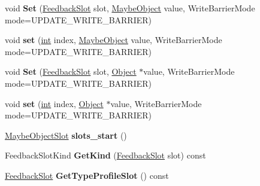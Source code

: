 \begin{DoxyCompactItemize}
void {\bfseries Set} (\mbox{\hyperlink{classv8_1_1internal_1_1FeedbackSlot}{Feedback\+Slot}} slot, \mbox{\hyperlink{classv8_1_1internal_1_1MaybeObject}{Maybe\+Object}} value, Write\+Barrier\+Mode mode=U\+P\+D\+A\+T\+E\+\_\+\+W\+R\+I\+T\+E\+\_\+\+B\+A\+R\+R\+I\+ER)
\item 
\mbox{\label{classv8_1_1internal_1_1FeedbackVector_a990a92b16bdd10fed3f2171a429e93ea}} 
void {\bfseries set} (\mbox{\hyperlink{classint}{int}} index, \mbox{\hyperlink{classv8_1_1internal_1_1MaybeObject}{Maybe\+Object}} value, Write\+Barrier\+Mode mode=U\+P\+D\+A\+T\+E\+\_\+\+W\+R\+I\+T\+E\+\_\+\+B\+A\+R\+R\+I\+ER)
\item 
\mbox{\label{classv8_1_1internal_1_1FeedbackVector_a4659ee16139f9aef68619f567f7bc4fc}} 
void {\bfseries Set} (\mbox{\hyperlink{classv8_1_1internal_1_1FeedbackSlot}{Feedback\+Slot}} slot, \mbox{\hyperlink{classv8_1_1internal_1_1Object}{Object}} $\ast$value, Write\+Barrier\+Mode mode=U\+P\+D\+A\+T\+E\+\_\+\+W\+R\+I\+T\+E\+\_\+\+B\+A\+R\+R\+I\+ER)
\item 
\mbox{\label{classv8_1_1internal_1_1FeedbackVector_a2d9eb85735692cc1f1488fc8409e2196}} 
void {\bfseries set} (\mbox{\hyperlink{classint}{int}} index, \mbox{\hyperlink{classv8_1_1internal_1_1Object}{Object}} $\ast$value, Write\+Barrier\+Mode mode=U\+P\+D\+A\+T\+E\+\_\+\+W\+R\+I\+T\+E\+\_\+\+B\+A\+R\+R\+I\+ER)
\item 
\mbox{\label{classv8_1_1internal_1_1FeedbackVector_a69e1e7d094cc71bc27ceac00d36624b4}} 
\mbox{\hyperlink{classv8_1_1internal_1_1MaybeObjectSlot}{Maybe\+Object\+Slot}} {\bfseries slots\+\_\+start} ()
\item 
\mbox{\label{classv8_1_1internal_1_1FeedbackVector_afd08a5e5100cff380a993c823f3cadb8}} 
Feedback\+Slot\+Kind {\bfseries Get\+Kind} (\mbox{\hyperlink{classv8_1_1internal_1_1FeedbackSlot}{Feedback\+Slot}} slot) const
\item 
\mbox{\label{classv8_1_1internal_1_1FeedbackVector_a2f4d0b2886f028af1f2fd2be2c4867ad}} 
\mbox{\hyperlink{classv8_1_1internal_1_1FeedbackSlot}{Feedback\+Slot}} {\bfseries Get\+Type\+Profile\+Slot} () const

\end{DoxyCompactItemize}
